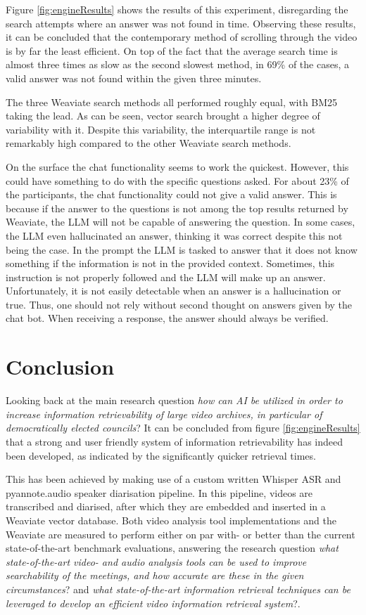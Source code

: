 \documentclass[twoside]{uva-inf-bachelor-thesis}
\begin{document}
Figure \ref{fig:engineResults} shows the results of this experiment, disregarding the search attempts where an answer was not found in time. 
Observing these results, it can be concluded that the contemporary method of scrolling through the video is by far the least efficient. On top of the fact that the average search time is almost three times as slow as the second slowest method, in 69\% of the cases, a valid answer was not found within the given three minutes.

The three Weaviate search methods all performed roughly equal, with BM25 taking the lead. As can be seen, vector search brought a higher degree of variability with it. Despite this variability, the interquartile range is not remarkably high compared to the other Weaviate search methods. 

On the surface the chat functionality seems to work the quickest. However, this could have something to do with the specific questions asked. For about 23\% of the participants, the chat functionality could not give a valid answer. This is because if the answer to the questions is not among the top results returned by Weaviate, the LLM will not be capable of answering the question. In some cases, the LLM even hallucinated an answer, thinking it was correct despite this not being the case. 
In the prompt the LLM is tasked to answer that it does not know something if the information is not in the provided context. Sometimes, this instruction is not properly followed and the LLM will make up an answer.
Unfortunately, it is not easily detectable when an answer is a hallucination or true. Thus, one should not rely without second thought on answers given by the chat bot. When receiving a response, the answer should always be verified.


\chapter{Conclusion}
Looking back at the main research question \textit{how can AI be utilized in order to increase information retrievability of large video archives, in particular of democratically elected councils}? It can be concluded from figure \ref{fig:engineResults} that a strong and user friendly system of information retrievability has indeed been developed, as indicated by the significantly quicker retrieval times. 

This has been achieved by making use of a custom written Whisper ASR and pyannote.audio speaker diarisation pipeline. In this pipeline, videos are transcribed and diarised, after which they are embedded and inserted in a Weaviate vector database. Both video analysis tool implementations and the Weaviate are measured to perform either on par with- or better than the current state-of-the-art benchmark evaluations, answering the research question \textit{what state-of-the-art video- and audio analysis tools can be used to improve searchability of the meetings, and how accurate are these in the given circumstances}? and \textit{what state-of-the-art information retrieval techniques can be leveraged to develop an efficient video information retrieval system}?.
\end{document}
